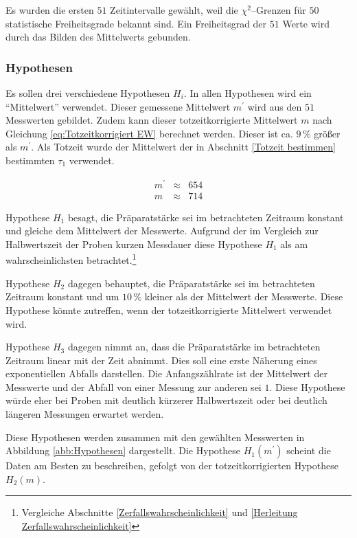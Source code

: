 \documentclass[12pt,a4paper]{scrartcl}
\numberwithin{equation}{section} %
\renewcommand{\[}{} %
\renewcommand{\]}{\noindent} %
\begin{document}
Es wurden die ersten \(51\) Zeitintervalle gewählt, weil die $\chi^2$--Grenzen für $50$ statistische Freiheitsgrade bekannt sind. \cite{Kapur} Ein Freiheitsgrad der $51$ Werte wird durch das Bilden des Mittelwerts gebunden.

\subsubsection{Hypothesen}
\label{Hypothesen}
Es sollen drei verschiedene Hypothesen $H_i$. In allen Hypothesen wird ein ``Mittelwert'' verwendet. Dieser gemessene Mittelwert $m^\prime$ wird aus den $51$ Messwerten gebildet. Zudem kann dieser totzeitkorrigierte Mittelwert $m$ nach Gleichung \ref{eq:Totzeitkorrigiert EW} berechnet werden. Dieser ist ca. $9\,\%$ größer als $m^\prime$. Als Totzeit wurde der Mittelwert der in Abschnitt \ref{Totzeit bestimmen} bestimmten $\tau_1$ verwendet.

\begin{eqnarray}
	m^\prime &\approx& 654 \\
	m &\approx& 714
\end{eqnarray}

Hypothese $H_1$ besagt, die Präparatstärke sei im betrachteten Zeitraum konstant und gleiche dem Mittelwert der Messwerte. Aufgrund der im Vergleich zur Halbwertszeit der Proben kurzen Messdauer diese Hypothese $H_1$ als am wahrscheinlichsten betrachtet.\footnote{Vergleiche Abschnitte \ref{Zerfallswahrscheinlichkeit} und \ref{Herleitung Zerfallswahrscheinlichkeit}}

Hypothese $H_2$ dagegen behauptet, die Präparatstärke sei im betrachteten Zeitraum konstant und um $10\,\%$ kleiner als der Mittelwert der Messwerte. Diese Hypothese könnte zutreffen, wenn der totzeitkorrigierte Mittelwert verwendet wird.

Hypothese $H_3$ dagegen nimmt an, dass die Präparatstärke im betrachteten Zeitraum linear mit der Zeit abnimmt. Dies soll eine erste Näherung eines exponentiellen Abfalls darstellen. Die Anfangszählrate ist der Mittelwert der Messwerte und der Abfall von einer Messung zur anderen sei $1$. Diese Hypothese würde eher bei Proben mit deutlich kürzerer Halbwertszeit oder bei deutlich längeren Messungen erwartet werden.

Diese Hypothesen werden zusammen mit den gewählten Messwerten in Abbildung \ref{abb:Hypothesen} dargestellt. Die Hypothese $H_1(m^\prime)$ scheint die Daten am Besten zu beschreiben, gefolgt von der totzeitkorrigierten Hypothese $H_2(m)$.
\end{document}

